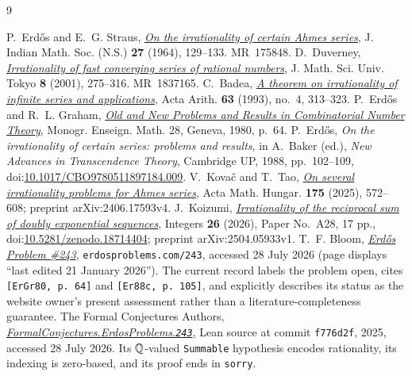 \documentclass[11pt]{article}
\begin{document}
\begin{thebibliography}{9}
\small
\raggedright
\setlength{\itemsep}{0pt}
 P.~Erd\H{o}s and E.~G. Straus,
  \href{https://users.renyi.hu/~p_erdos/1964-19.pdf}{\emph{On the irrationality
  of certain Ahmes series}},
  J. Indian Math. Soc. (N.S.) \textbf{27} (1964), 129--133. MR~175848.
 D.~Duverney,
  \href{https://www.ms.u-tokyo.ac.jp/journal/pdf/jms080206.pdf}
  {\emph{Irrationality of fast converging series of rational numbers}},
  J. Math. Sci. Univ. Tokyo \textbf{8} (2001), 275--316. MR~1837165.
 C.~Badea,
  \href{https://matwbn.icm.edu.pl/ksiazki/aa/aa63/aa6342.pdf}{\emph{A theorem
  on irrationality of infinite series and applications}}, Acta Arith.
  \textbf{63} (1993), no.~4, 313--323.
 P.~Erd\H{o}s and R.~L. Graham,
  \href{https://mathweb.ucsd.edu/~ronspubs/80_11_number_theory.pdf}{\emph{Old
  and New Problems and Results in Combinatorial Number Theory}},
  Monogr. Enseign. Math. 28, Geneva, 1980, p.~64.
 P.~Erd\H{o}s, \emph{On the irrationality of certain series:
  problems and results}, in A.~Baker (ed.), \emph{New Advances in Transcendence
  Theory}, Cambridge UP, 1988, pp.~102--109,
  doi:\href{https://doi.org/10.1017/CBO9780511897184.009}{10.1017/CBO9780511897184.009}.
 V.~Kova\v{c} and T.~Tao,
  \href{https://arxiv.org/abs/2406.17593}{\emph{On several irrationality
  problems for Ahmes series}}, Acta Math. Hungar. \textbf{175} (2025),
  572--608; preprint arXiv:2406.17593v4.
 J.~Koizumi,
  \href{https://math.colgate.edu/~integers/aa28/aa28.pdf}
  {\emph{Irrationality of the reciprocal sum of doubly exponential sequences}},
  Integers \textbf{26} (2026), Paper No.~A28, 17 pp.,
  doi:\href{https://doi.org/10.5281/zenodo.18714404}{10.5281/zenodo.18714404};
  preprint arXiv:2504.05933v1.
 T.~F. Bloom,
  \href{https://www.erdosproblems.com/243}{\emph{Erd\H{o}s Problem \#243}},
  \texttt{erdosproblems.com/243}, accessed 28 July 2026 (page displays
  ``last edited 21 January 2026'').  The current record labels the problem
  open, cites \texttt{[ErGr80, p.~64]} and \texttt{[Er88c, p.~105]}, and
  explicitly describes its status as the website owner's present assessment
  rather than a literature-completeness guarantee.
 The Formal Conjectures Authors,
  \href{https://github.com/google-deepmind/formal-conjectures/blob/f776d2f2039351b00737ffcafb9d7d7666e1d9af/FormalConjectures/ErdosProblems/243.lean}
  {\emph{FormalConjectures.ErdosProblems.\texttt{243}}},
  Lean source at commit \texttt{f776d2f}, 2025, accessed 28 July 2026.
  Its $\mathbb{Q}$-valued \texttt{Summable} hypothesis encodes rationality, its
  indexing is zero-based, and its proof ends in \texttt{sorry}.
\end{thebibliography}
\end{document}
